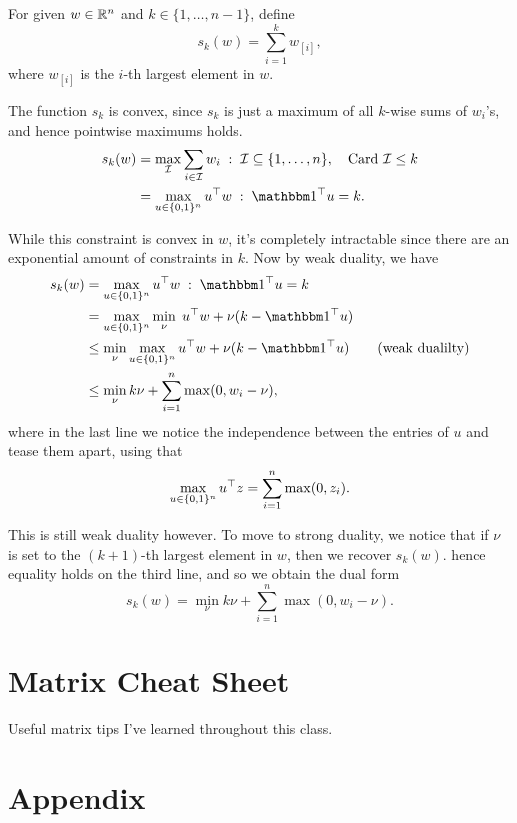 \documentclass[11 pt]{scrartcl}
\begin{document}
\begin{example}
For given $w\in \mathbb R^n$ and $k\in \{1,\dots, n-1\}$, define 
\[ s_k(w) = \sum_{i=1}^k w_{[i]},\] 
where $w_{[i]}$ is the $i$-th largest element in $w$.

The function $s_k$ is convex, since $s_k$ is just a maximum of all $k$-wise sums of $w_i$'s, and hence pointwise maximums holds. 
\begin{align*}
    s_k(w) &= \max_{\Ical} \sum_{i\in\Ical} w_i \; :\; \Ical \subseteq \{1, \dots, n\},\quad \text{Card }\Ical \leq k \\ 
           &= \max_{u\in\{0,1\}^n} u^\T w \; :\; \one^\T u = k.
\end{align*}

While this constraint is convex in $w$, it's completely intractable since there are an exponential amount of constraints in $k$. 
Now by weak duality, we have 
\begin{align*}
    s_k(w) &= \max_{u\in \{0,1\}^n} u^\T w \; : \; \one^\T u = k \\ 
           &= \max_{u\in \{0,1\}^n} \min_\nu\; u^\T w +\nu  (k - \one^\T u) \\ 
           &\leq \min_\nu \max_{u\in \{0,1\}^n} u^\T w +\nu  (k - \one^\T u) \tag{weak dualilty} \\ 
           &\leq \min_\nu k\nu + \sum_{i=1}^n \max(0, w_i - \nu),
\end{align*}
where in the last line we notice the independence between the entries of $u$ and tease them apart, using that 
\[ \max_{u\in \{0,1\}^n} u^\top z = \sum_{i=1}^n \max(0, z_i).\] 

This is still weak duality however. 
To move to strong duality, we notice that if $\nu$ is set to the $(k+1)$-th largest element in $w$, then we recover $s_k(w)$. 
hence equality holds on the third line, and so we obtain the dual form 
\[ s_k(w) = \min_\nu k\nu + \sum_{i=1}^n \max(0, w_i -\nu).\] 
\end{example}

\newpage
\section{Matrix Cheat Sheet}
Useful matrix tips I've learned throughout this class. 


\section{Appendix}
\renewcommand{\listtheoremname}{List of Definitions and Theorems}
\listoftheorems[ignoreall,show={theorem,definition}]

\listoftodos
\end{document}

